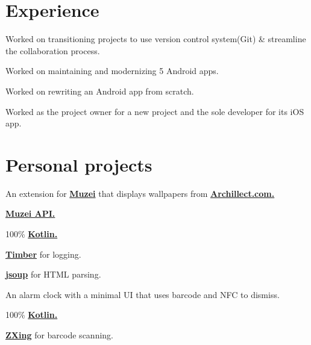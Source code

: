 \documentclass[]{deedy-resume}
\begin{document}
\begin{minipage}[t]{0.66\textwidth} 


\section{Experience}
\vspace{\topsep} %
\begin{tightemize}
\item Worked on transitioning projects to use version control system(Git) \& streamline the collaboration process.
\item Worked on maintaining and modernizing 5 Android apps.
\item Worked on rewriting an Android app from scratch.
\item Worked as the project owner for a new project and the sole developer for its iOS app.
\end{tightemize}
\sectionsep


\section{Personal projects}
An extension for \textbf{\href{http://muzei.co}{Muzei}} that displays wallpapers from \textbf{\href{http://Archillect.com}{Archillect.com.}}
\begin{tightemize}
\item \textbf{\href{http://api.muzei.co}{Muzei API.}}
\item 100\% \textbf{\href{http://kotlinlang.org}{Kotlin.}}
\item \textbf{\href{http://github.com/JakeWharton/timber}{Timber}} for logging.
\item \textbf{\href{http://jsoup.org}{jsoup}} for HTML parsing.
\end{tightemize}
\sectionsep

An alarm clock with a minimal UI that uses barcode and NFC to dismiss.
\begin{tightemize}
\item 100\% \textbf{\href{http://kotlinlang.org}{Kotlin.}}
\item \textbf{\href{http://github.com/zxing/zxing}{ZXing}} for barcode scanning.
\end{tightemize}
\sectionsep


\end{minipage}
\end{document}
